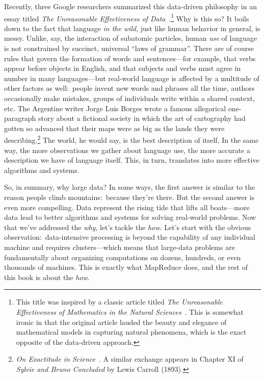 Recently, three Google researchers summarized this data-driven
philosophy in an essay titled \emph{The Unreasonable Effectiveness of
  Data}~\cite{Halevy_etal_2009}.\footnote{This title was inspired by a
  classic article titled \emph{The Unreasonable Effectiveness of
    Mathematics in the Natural Sciences}~\cite{Wigner_1960}.  This is
  somewhat ironic in that the original article lauded the beauty and
  elegance of mathematical models in capturing natural phenomena,
  which is the exact opposite of the data-driven approach.} Why is
this so?  It boils down to the fact that language \emph{in the wild},
just like human behavior in general, is messy.  Unlike, say, the
interaction of subatomic particles, human \emph{use} of language is not
constrained by succinct, universal ``laws of grammar''.  There are of
course rules that govern the formation of words and sentences---for
example, that verbs appear before objects in English, and that
subjects and verbs must agree in number in many languages---but
real-world language is affected by a multitude of other factors as
well:\ people invent new words and phrases all the time, authors
occasionally make mistakes, groups of individuals write within a
shared context, etc.  The Argentine writer Jorge Luis Borges wrote a
famous allegorical one-paragraph story about a fictional society in
which the art of cartography had gotten so advanced that their maps
were as big as the lands they were describing.\footnote{\emph{On
    Exactitude in Science}~\cite{Borges_1999}.  A similar exchange
  appears in Chapter XI of \emph{Sylvie and Bruno Concluded} by Lewis
  Carroll (1893).} The world, he would say, is the best description of
itself.  In the same way, the more observations we gather about
language use, the more accurate a description we have of language
itself.  This, in turn, translates into more effective algorithms and
systems.

So, in summary, why large data?  In some ways, the first answer is
similar to the reason people climb mountains:\ because they're there.
But the second answer is even more compelling.  Data represent the
rising tide that lifts all boats---more data lead to better algorithms
and systems for solving real-world problems.  Now that we've addressed
the \emph{why}, let's tackle the \emph{how}.  Let's start with the
obvious observation:\ data-intensive processing is beyond the
capability of any individual machine and requires clusters---which
means that large-data problems are fundamentally about organizing
computations on dozens, hundreds, or even thousands of machines.  This
is exactly what MapReduce does, and the rest of this book is about the
\emph{how}.


